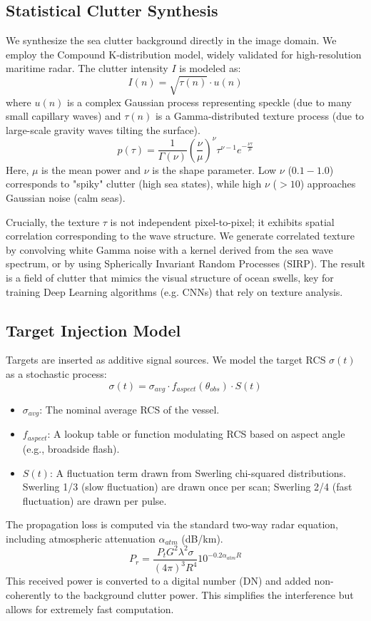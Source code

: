 \documentclass[conf]{new-aiaa}
\begin{document}
\subsection{Statistical Clutter Synthesis}
We synthesize the sea clutter background directly in the image domain. We employ the Compound K-distribution model, widely validated for high-resolution maritime radar. The clutter intensity $I$ is modeled as:
\begin{equation}
    I(n) = \sqrt{\tau(n)} \cdot u(n)
\end{equation}
where $u(n)$ is a complex Gaussian process representing speckle (due to many small capillary waves) and $\tau(n)$ is a Gamma-distributed texture process (due to large-scale gravity waves tilting the surface).
\begin{equation}
    p(\tau) = \frac{1}{\Gamma(\nu)} \left(\frac{\nu}{\mu}\right)^\nu \tau^{\nu-1} e^{-\frac{\nu \tau}{\mu}}
\end{equation}
Here, $\mu$ is the mean power and $\nu$ is the shape parameter. Low $\nu$ ($0.1-1.0$) corresponds to "spiky" clutter (high sea states), while high $\nu$ ($>10$) approaches Gaussian noise (calm seas).

Crucially, the texture $\tau$ is not independent pixel-to-pixel; it exhibits spatial correlation corresponding to the wave structure. We generate correlated texture by convolving white Gamma noise with a kernel derived from the sea wave spectrum, or by using Spherically Invariant Random Processes (SIRP). The result is a field of clutter that mimics the visual structure of ocean swells, key for training Deep Learning algorithms (e.g. CNNs) that rely on texture analysis.

\subsection{Target Injection Model}
Targets are inserted as additive signal sources. We model the target RCS $\sigma(t)$ as a stochastic process:
\begin{equation}
    \sigma(t) = \sigma_{avg} \cdot f_{aspect}(\theta_{obs}) \cdot S(t)
\end{equation}
\begin{itemize}
    \item $\sigma_{avg}$: The nominal average RCS of the vessel.
    \item $f_{aspect}$: A lookup table or function modulating RCS based on aspect angle (e.g., broadside flash).
    \item $S(t)$: A fluctuation term drawn from Swerling chi-squared distributions. Swerling 1/3 (slow fluctuation) are drawn once per scan; Swerling 2/4 (fast fluctuation) are drawn per pulse.
\end{itemize}
The propagation loss is computed via the standard two-way radar equation, including atmospheric attenuation $\alpha_{atm}$ (dB/km).
\begin{equation}
    P_r = \frac{P_t G^2 \lambda^2 \sigma}{(4\pi)^3 R^4} 10^{-0.2 \alpha_{atm} R}
\end{equation}
This received power is converted to a digital number (DN) and added non-coherently to the background clutter power. This simplifies the interference but allows for extremely fast computation.
\end{document}

